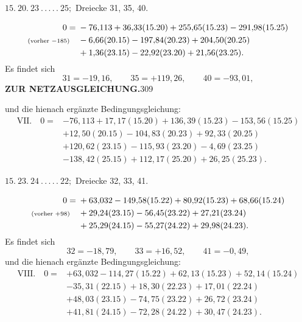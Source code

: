 \par\bigskip
\begin{center}
$15.\ 20.\ 23\ .\,.\,.\,.\,.\ 25;$ Dreiecke 31, 35, 40.
\end{center}
\[
\begin{aligned}
0={}&-76{,}113+36{,}33(15.20)+255{,}65(15.23)-291{,}98(15.25)\\
\text{\scriptsize(vorher $-185$)}\quad&-6{,}66(20.15)-197{,}84(20.23)+204{,}50(20.25)\\
&+1{,}36(23.15)-22{,}92(23.20)+21{,}56(23.25).
\end{aligned}
\]
Es findet sich
\[
31=-19{,}16,\qquad35=+119{,}26,\qquad40=-93{,}01,
\]
\newpage
\noindent\textbf{ZUR NETZAUSGLEICHUNG.}\hfill309\par\medskip
\noindent und die hienach ergänzte Bedingungsgleichung:
\[
\begin{aligned}
\mathrm{VII.}\quad0={}&-76{,}113+17{,}17(15.20)+136{,}39(15.23)-153{,}56(15.25)\\
&+12{,}50(20.15)-104{,}83(20.23)+92{,}33(20.25)\\
&+120{,}62(23.15)-115{,}93(23.20)-4{,}69(23.25)\\
&-138{,}42(25.15)+112{,}17(25.20)+26{,}25(25.23).
\end{aligned}
\]

\par\bigskip
\begin{center}
$15.\ 23.\ 24\ .\,.\,.\,.\,.\ 22;$ Dreiecke 32, 33, 41.
\end{center}
\[
\begin{aligned}
0={}&+63{,}032-149{,}58(15.22)+80{,}92(15.23)+68{,}66(15.24)\\
\text{\scriptsize(vorher $+98$)}\quad&+29{,}24(23.15)-56{,}45(23.22)+27{,}21(23.24)\\
&+25{,}29(24.15)-55{,}27(24.22)+29{,}98(24.23).
\end{aligned}
\]
Es findet sich
\[
32=-18{,}79,\qquad33=+16{,}52,\qquad41=-0{,}49,
\]
und die hienach ergänzte Bedingungsgleichung:
\[
\begin{aligned}
\mathrm{VIII.}\quad0={}&+63{,}032-114{,}27(15.22)+62{,}13(15.23)+52{,}14(15.24)\\
&-35{,}31(22.15)+18{,}30(22.23)+17{,}01(22.24)\\
&+48{,}03(23.15)-74{,}75(23.22)+26{,}72(23.24)\\
&+41{,}81(24.15)-72{,}28(24.22)+30{,}47(24.23).
\end{aligned}
\]


